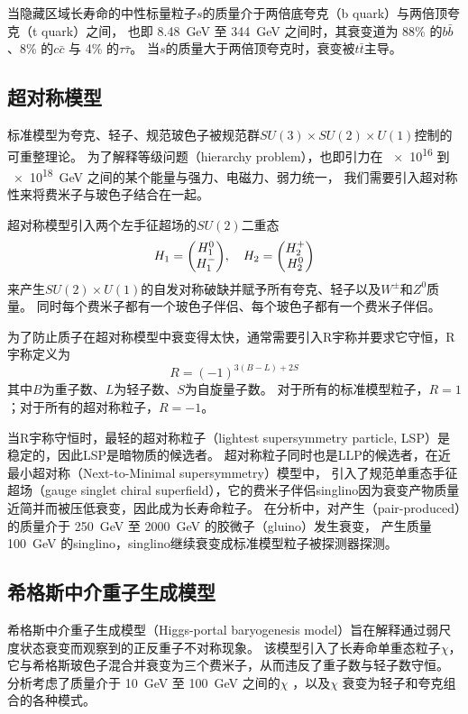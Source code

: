 当隐藏区域长寿命的中性标量粒子$s$的质量介于两倍底夸克（b quark）与两倍顶夸克（t quark）之间，
也即 \SI{8.48}{GeV} 至 \SI{344}{GeV} 之间时，其衰变道为 88\% 的$b \bar{b}$、8\% 的$c \bar{c}$ 与 4\% 的$\tau \bar{\tau}$。
当$s$的质量大于两倍顶夸克时，衰变被$t \bar{t}$主导。


\subsection{超对称模型}
标准模型为夸克、轻子、规范玻色子被规范群$SU(3)\times SU(2) \times U(1)$控制的可重整理论。
为了解释等级问题（hierarchy problem），也即引力在 \num{e16} 到 \SI{e18}{GeV} 之间的某个能量与强力、电磁力、弱力统一，
我们需要引入超对称性来将费米子与玻色子结合在一起。

超对称模型引入两个左手征超场的$SU(2)$二重态
$$H_1 = \mqty(H_1^0 \\ H_1^-) \qc H_2 = \mqty(H_2^+ \\ H_2^0) $$
来产生$SU(2) \times U(1)$的自发对称破缺并赋予所有夸克、轻子以及$W^\pm$和$Z^0$质量。
同时每个费米子都有一个玻色子伴侣、每个玻色子都有一个费米子伴侣。
\cite{QFT_Weinberg}

为了防止质子在超对称模型中衰变得太快，通常需要引入R宇称并要求它守恒，R宇称定义为
\begin{equation}
    R = (-1)^{3(B-L)+2S}
\end{equation}
其中$B$为重子数、$L$为轻子数、$S$为自旋量子数。
对于所有的标准模型粒子，$R=1$；对于所有的超对称粒子，$R=-1$。
\cite{SUSY_ATLAS}

当R宇称守恒时，最轻的超对称粒子（lightest supersymmetry particle, LSP）是稳定的，因此LSP是暗物质的候选者。
超对称粒子同时也是LLP的候选者，在近最小超对称（Next-to-Minimal supersymmetry）模型中，
引入了规范单重态手征超场（gauge singlet chiral superfield），它的费米子伴侣singlino因为衰变产物质量近简并而被压低衰变，因此成为长寿命粒子。
\cite{singlino}
在分析中，对产生（pair-produced）的质量介于 \SI{250}{GeV} 至 \SI{2000}{GeV} 的胶微子（gluino）发生衰变，
产生质量 \SI{100}{GeV} 的singlino，singlino继续衰变成标准模型粒子被探测器探测。


\subsection{希格斯中介重子生成模型}
希格斯中介重子生成模型（Higgs-portal baryogenesis model）旨在解释通过弱尺度状态衰变而观察到的正反重子不对称现象。
该模型引入了长寿命单重态粒子$\chi$，它与希格斯玻色子混合并衰变为三个费米子，从而违反了重子数与轻子数守恒。
分析考虑了质量介于 10~GeV 至 100~GeV 之间的$\chi$ ，以及$\chi$ 衰变为轻子和夸克组合的各种模式。

